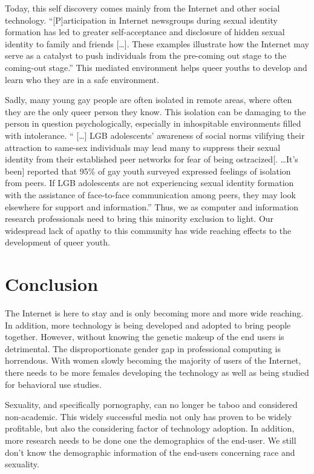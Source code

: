 \documentclass{acmsmall}
\begin{document}
Today, this self discovery comes mainly from the Internet and other social technology. ``[P]articipation in Internet newsgroups during sexual identity formation has led to greater self-acceptance and disclosure of hidden sexual identity to family and friends [\ldots]. These examples illustrate how the Internet may serve as a catalyst to push individuals from the pre-coming out stage to the coming-out stage.'' \cite{bond13} This mediated environment helps queer youths to develop and learn who they are in a safe environment. 

Sadly, many young gay people are often isolated in remote areas, where often they are the only queer person they know. This isolation can be damaging to the person in question psychologically, especially in inhospitable environments filled with intolerance. ``  [\ldots] LGB adolescents' awareness of social norms vilifying their attraction to same-sex individuals may lead many to suppress their sexual identity from their established peer networks for fear of being ostracized[. \ldots It's been] reported that 95\% of gay youth surveyed expressed feelings of isolation from peers. If LGB adolescents are not experiencing sexual identity formation with the assistance of face-to-face communication among peers, they may look elsewhere for support and information.'' \cite{bond13} Thus, we as computer and information research professionals need to bring this minority exclusion to light. Our widespread lack of apathy to this community has wide reaching effects to the development of queer youth.

\section{Conclusion}
The Internet is here to stay and is only becoming more and more wide reaching. In addition, more technology is being developed and adopted to bring people together. However, without knowing the genetic makeup of the end users is detrimental. The disproportionate gender gap in professional computing is horrendous. With women slowly becoming the majority of users of the Internet, there needs to be more females developing the technology as well as being studied for behavioral use studies. 

Sexuality, and specifically pornography, can no longer be taboo and considered non-academic. This widely successful media not only has proven to be widely profitable, but also the considering factor of technology adoption. In addition, more research needs to be done one the demographics of the end-user. We still don't know the demographic information of the end-users concerning race and sexuality.
\end{document}
